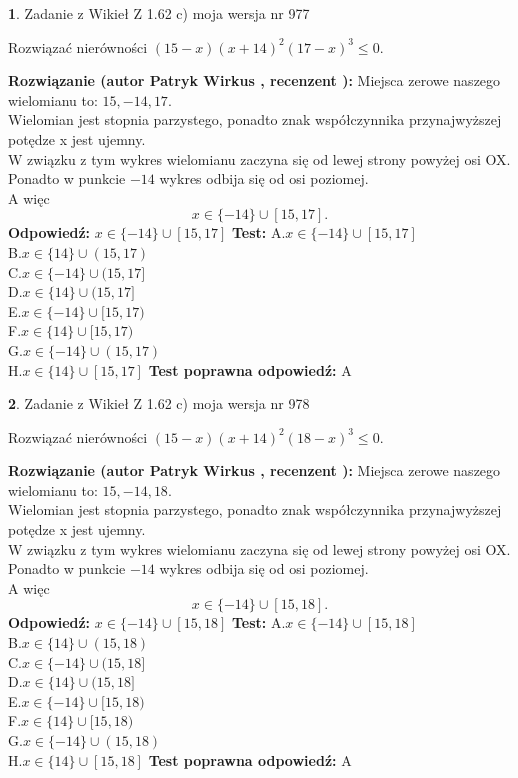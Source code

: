 \documentclass[12pt, a4paper]{article}
\theoremstyle{definition} %
\newtheorem{zad}{}
\newcommand{\zadStart}[1]{\begin{zad}#1\newline}
\newcommand{\zadStop}{\end{zad}}
\newcommand{\rozwStart}[2]{\noindent \textbf{Rozwiązanie (autor #1 , recenzent #2): }\newline}
\newcommand{\rozwStop}{\newline}
\newcommand{\odpStart}{\noindent \textbf{Odpowiedź:}\newline}
\newcommand{\odpStop}{\newline}
\newcommand{\testStart}{\noindent \textbf{Test:}\newline}
\newcommand{\testStop}{\newline}
\newcommand{\kluczStart}{\noindent \textbf{Test poprawna odpowiedź:}\newline}
\newcommand{\kluczStop}{\newline}
\begin{document}
\zadStart{Zadanie z Wikieł Z 1.62 c) moja wersja nr 977}

Rozwiązać nierówności $(15-x)(x+14)^{2}(17-x)^{3}\le0$.
\zadStop
\rozwStart{Patryk Wirkus}{}
Miejsca zerowe naszego wielomianu to: $15, -14, 17$.\\
Wielomian jest stopnia parzystego, ponadto znak współczynnika przy\linebreak najwyższej potędze x jest ujemny.\\ W związku z tym wykres wielomianu zaczyna się od lewej strony powyżej osi OX.\\
Ponadto w punkcie $-14$ wykres odbija się od osi poziomej.\\
A więc $$x \in \{-14\} \cup [15,17].$$
\rozwStop
\odpStart
$x \in \{-14\} \cup [15,17]$
\odpStop
\testStart
A.$x \in \{-14\} \cup [15,17]$\\
B.$x \in \{14\} \cup (15,17)$\\
C.$x \in \{-14\} \cup (15,17]$\\
D.$x \in \{14\} \cup (15,17]$\\
E.$x \in \{-14\} \cup [15,17)$\\
F.$x \in \{14\} \cup [15,17)$\\
G.$x \in \{-14\} \cup (15,17)$\\
H.$x \in \{14\} \cup [15,17]$
\testStop
\kluczStart
A
\kluczStop



\zadStart{Zadanie z Wikieł Z 1.62 c) moja wersja nr 978}

Rozwiązać nierówności $(15-x)(x+14)^{2}(18-x)^{3}\le0$.
\zadStop
\rozwStart{Patryk Wirkus}{}
Miejsca zerowe naszego wielomianu to: $15, -14, 18$.\\
Wielomian jest stopnia parzystego, ponadto znak współczynnika przy\linebreak najwyższej potędze x jest ujemny.\\ W związku z tym wykres wielomianu zaczyna się od lewej strony powyżej osi OX.\\
Ponadto w punkcie $-14$ wykres odbija się od osi poziomej.\\
A więc $$x \in \{-14\} \cup [15,18].$$
\rozwStop
\odpStart
$x \in \{-14\} \cup [15,18]$
\odpStop
\testStart
A.$x \in \{-14\} \cup [15,18]$\\
B.$x \in \{14\} \cup (15,18)$\\
C.$x \in \{-14\} \cup (15,18]$\\
D.$x \in \{14\} \cup (15,18]$\\
E.$x \in \{-14\} \cup [15,18)$\\
F.$x \in \{14\} \cup [15,18)$\\
G.$x \in \{-14\} \cup (15,18)$\\
H.$x \in \{14\} \cup [15,18]$
\testStop
\kluczStart
A
\kluczStop
\end{document}

